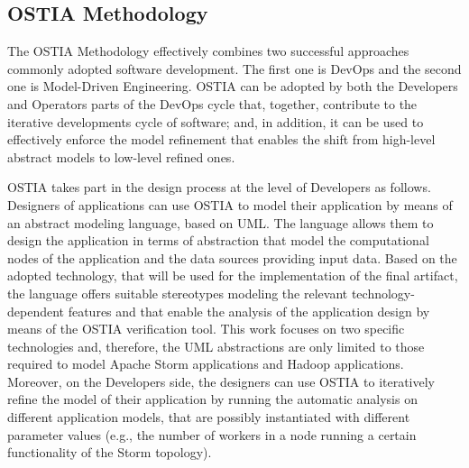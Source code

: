 \documentclass[smallextended]{svjour3}       %
\begin{document}

{\color{blue}
\subsection{OSTIA Methodology}
\label{sec:methodology}
The OSTIA Methodology effectively combines two successful approaches commonly adopted software development. 
The first one is DevOps and the second one is Model-Driven Engineering.
OSTIA can be adopted by both the Developers and Operators parts of the DevOps cycle that, together, contribute to the iterative developments cycle of software; and, in addition, it can be used to effectively enforce the model refinement that enables the shift from high-level abstract models to low-level refined ones.

OSTIA takes part in the design process at the level of Developers as follows.
Designers of applications can use OSTIA to model their application by means of an abstract modeling language, based on UML. 
The language allows them to design the application in terms of abstraction that model the computational nodes of the application and the data sources providing input data.
Based on the adopted technology, that will be used for the implementation of the final artifact, the language offers suitable stereotypes modeling the relevant technology-dependent features and that enable the analysis of the application design by means of the OSTIA verification tool.
This work focuses on two specific technologies and, therefore, the UML abstractions are only limited to those required to model Apache Storm applications and Hadoop applications.
Moreover, on the Developers side, the designers can use OSTIA to iteratively refine the model of their application by running the automatic analysis on different application models, that are possibly instantiated with different parameter values (e.g., the number of workers in a node running a certain functionality of the Storm topology).

}
\end{document}
